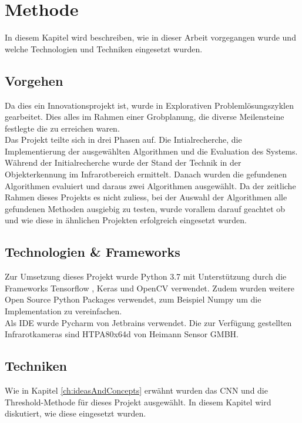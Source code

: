 \chapter{Methode}

In diesem Kapitel wird beschreiben, wie in dieser Arbeit vorgegangen wurde und welche Technologien und Techniken eingesetzt wurden.


\section{Vorgehen}

Da dies ein Innovationsprojekt ist, wurde in Explorativen Problemlösungszyklen gearbeitet. Dies alles im Rahmen einer Grobplanung, die diverse Meilensteine festlegte die zu erreichen waren.\\
Das Projekt teilte sich in drei Phasen auf.  Die Intialrecherche, die Implementierung der ausgewählten Algorithmen und die Evaluation des Systems.\\
Während der Initialrecherche wurde der Stand der Technik in der Objekterkennung im Infrarotbereich ermittelt. Danach wurden die gefundenen Algorithmen evaluiert und daraus zwei Algorithmen ausgewählt. Da der zeitliche Rahmen dieses Projekts es nicht zuliess, bei der Auswahl der Algorithmen alle gefundenen Methoden ausgiebig zu testen, wurde vorallem darauf geachtet ob und wie diese in ähnlichen Projekten erfolgreich eingesetzt wurden.

\section{Technologien \& Frameworks}
Zur Umsetzung dieses Projekt wurde Python 3.7 mit Unterstützung durch die Frameworks Tensorflow \parencite{tensorflow2015}, Keras \parencite{keras} und OpenCV \parencite{opencv} verwendet. Zudem wurden weitere Open Source Python Packages verwendet, zum Beispiel Numpy \parencite{numpy} um die Implementation zu vereinfachen.\\
Als \gls{IDE} wurde Pycharm von Jetbrains \parencite{pycharm} verwendet. Die zur Verfügung gestellten Infrarotkameras sind HTPA80x64d von Heimann Sensor GMBH.

\section{Techniken}

Wie in Kapitel \ref{ch:ideasAndConcepts} erwähnt wurden das \gls{CNN} und die Threshold-Methode für dieses Projekt ausgewählt. In diesem Kapitel wird diskutiert, wie diese eingesetzt wurden.


